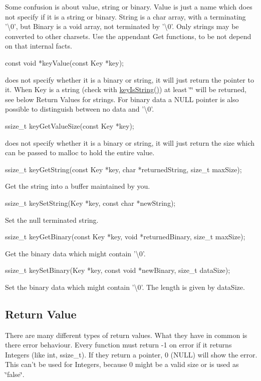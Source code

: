 Some confusion is about value, string or binary. Value is just a name which does not specify if it is a string or binary. String is a char array, with a terminating '\textbackslash{}0', but Binary is a void array, not terminated by '\textbackslash{}0'. Only strings may be converted to other charsets. Use the appendant Get functions, to be not depend on that internal facts. \begin{DoxyVerb}    const void *keyValue(const Key *key);
\end{DoxyVerb}
 does not specify whether it is a binary or string, it will just return the pointer to it. When Key is a string (check with {\ttfamily \hyperlink{group__keytest_gaea7670778abd07fee0fe8ac12a149190}{key\+Is\+String()}}) at least \char`\"{}\char`\"{} will be returned, see below Return Values for strings. For binary data a N\+U\+L\+L pointer is also possible to distinguish between no data and '\textbackslash{}0'. \begin{DoxyVerb}    ssize_t keyGetValueSize(const Key *key);
\end{DoxyVerb}
 does not specify whether it is a binary or string, it will just return the size which can be passed to malloc to hold the entire value. \begin{DoxyVerb}    ssize_t keyGetString(const Key *key, char *returnedString, size_t maxSize);
\end{DoxyVerb}
 Get the string into a buffer maintained by you. \begin{DoxyVerb}    ssize_t keySetString(Key *key, const char *newString);
\end{DoxyVerb}
 Set the null terminated string. \begin{DoxyVerb}    ssize_t keyGetBinary(const Key *key, void *returnedBinary, size_t maxSize);
\end{DoxyVerb}
 Get the binary data which might contain '\textbackslash{}0'. \begin{DoxyVerb}    ssize_t keySetBinary(Key *key, const void *newBinary, size_t dataSize);
\end{DoxyVerb}
 Set the binary data which might contain '\textbackslash{}0'. The length is given by data\+Size.

\subsection*{Return Value}

There are many different types of return values. What they have in common is there error behaviour. Every function must return -\/1 on error if it returns Integers (like int, ssize\+\_\+t). If they return a pointer, 0 (N\+U\+L\+L) will show the error. This can't be used for Integers, because 0 might be a valid size or is used as \char`\"{}false\char`\"{}.

